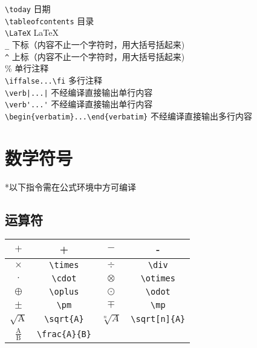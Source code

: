 \documentclass[a4paper,10pt]{ctexart}
\begin{document}
\noindent
\verb|\today| 日期\\
\verb|\tableofcontents| 目录\\
\verb|\LaTeX| \LaTeX\\
\verb|_| 下标（内容不止一个字符时，用大括号括起来)\\
\verb|^| 上标（内容不止一个字符时，用大括号括起来)\\
\% 单行注释\\
\verb|\iffalse...\fi| 多行注释\\
\verb'\verb|...|' 不经编译直接输出单行内容\\
\verb|\verb'...'| 不经编译直接输出单行内容\\
\verb|\begin{verbatim}...\end{verbatim}| 不经编译直接输出多行内容\\

\section{数学符号}
*以下指令需在公式环境中方可编译
\subsection{运算符}
\begin{table}[H]
	\begin{center}
		\begin{tabular}{|c|c|c|c|}
		\hline
		$+$ &+ &$-$ &-\\
		\hline
		$\times$ &\verb|\times| &$\div$ &\verb|\div|\\
		\hline
		$\cdot$ &\verb|\cdot| &$\otimes$ &\verb|\otimes|\\
		\hline
		$\oplus$ &\verb|\oplus| &$\odot$ &\verb|\odot|\\
		\hline
		$\pm$ &\verb|\pm| &$\mp$ &\verb|\mp|\\
		\hline
		$\sqrt{\mathrm{A}}$ &\verb|\sqrt{A}|&$\sqrt[n]{A}$ &\verb|\sqrt[n]{A}|\\
		\hline
		$\frac{\mathrm{A}}{\mathrm{B}}$ &\verb|\frac{A}{B}|&&\\
		\hline
		\end{tabular}
	\end{center}
\end{table}
\end{document}
